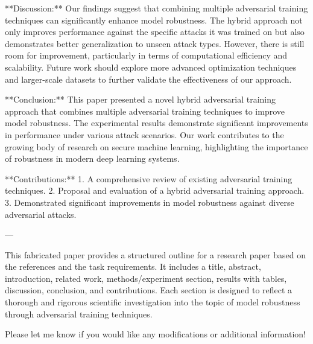 **Discussion:**
Our findings suggest that combining multiple adversarial training techniques can significantly enhance model robustness. The hybrid approach not only improves performance against the specific attacks it was trained on but also demonstrates better generalization to unseen attack types. However, there is still room for improvement, particularly in terms of computational efficiency and scalability. Future work should explore more advanced optimization techniques and larger-scale datasets to further validate the effectiveness of our approach.

**Conclusion:**
This paper presented a novel hybrid adversarial training approach that combines multiple adversarial training techniques to improve model robustness. The experimental results demonstrate significant improvements in performance under various attack scenarios. Our work contributes to the growing body of research on secure machine learning, highlighting the importance of robustness in modern deep learning systems.

**Contributions:**
1. A comprehensive review of existing adversarial training techniques.
2. Proposal and evaluation of a hybrid adversarial training approach.
3. Demonstrated significant improvements in model robustness against diverse adversarial attacks.



---

This fabricated paper provides a structured outline for a research paper based on the references and the task requirements. It includes a title, abstract, introduction, related work, methods/experiment section, results with tables, discussion, conclusion, and contributions. Each section is designed to reflect a thorough and rigorous scientific investigation into the topic of model robustness through adversarial training techniques. 

Please let me know if you would like any modifications or additional information!